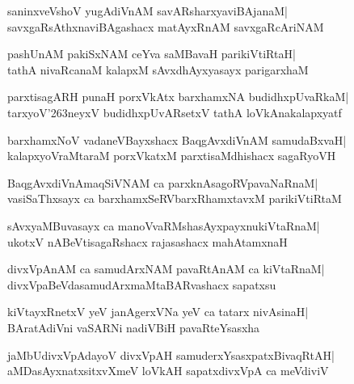 \documentclass[twoside,12pt,openright]{book}
\def\S{\char'263}
\newcounter{shloka}[chapter]
\begin{document}
\begin{shloka}%
saninxveVshoV yugAdiVnAM savARsharxyaviBAjanaM|\\
savxgaRsAthxnaviBAgashacx matAyxRnAM savxgaRcAriNAM
\end{shloka}

\begin{shloka}%
pashUnAM pakiSxNAM ceYva saMBavaH parikiVtiRtaH|\\
tathA nivaRcanaM kalapxM sAvxdhAyxyasayx parigarxhaM
\end{shloka}

\begin{shloka}%
parxtisagARH punaH porxVkAtx barxhamxNA budidhxpUvaRkaM|\\
tarxyoV\S neyxV budidhxpUvARsetxV tathA loVkAnakalapxyatf
\end{shloka}

\begin{shloka}%
barxhamxNoV vadaneVBayxshacx BaqgAvxdiVnAM samudaBxvaH|\\
kalapxyoVraMtaraM porxVkatxM parxtisaMdhishacx sagaRyoVH
\end{shloka}

\begin{shloka}%
BaqgAvxdiVnAmaqSiVNAM ca parxknAsagoRVpavaNaRnaM|\\
vasiSaThxsayx ca barxhamxSeRVbarxRhamxtavxM parikiVtiRtaM
\end{shloka}

\begin{shloka}%
sAvxyaMBuvasayx ca manoVvaRMshasAyxpayxnukiVtaRnaM|\\
ukotxV nABeVtisagaRshacx rajasashacx mahAtamxnaH
\end{shloka}

\begin{shloka}%
divxVpAnAM ca samudArxNAM pavaRtAnAM ca kiVtaRnaM|\\
divxVpaBeVdasamudArxmaMtaBARvashacx sapatxsu
\end{shloka}

\begin{shloka}%
kiVtayxRnetxV yeV janAgerxVNa yeV ca tatarx nivAsinaH|\\
BAratAdiVni vaSARNi nadiVBiH pavaRteYsasxha
\end{shloka}

\begin{shloka}%
jaMbUdivxVpAdayoV divxVpAH samuderxYsasxpatxBivaqRtAH|\\
aMDasAyxnatxsitxvXmeV loVkAH sapatxdivxVpA ca meVdiviV
\end{shloka}
\end{document}
